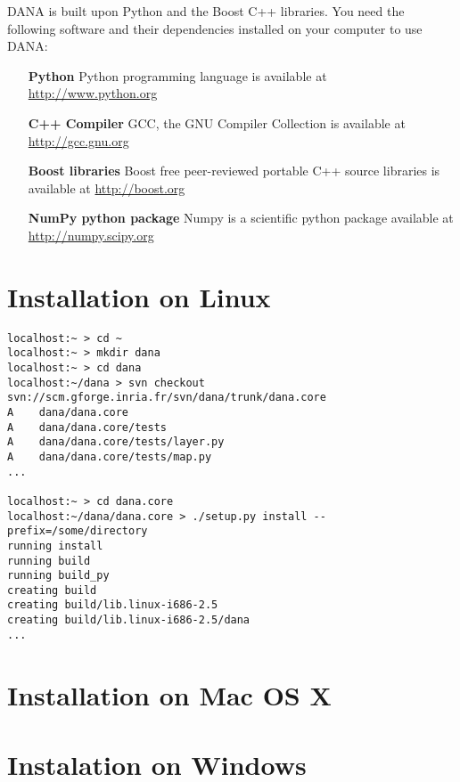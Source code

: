 DANA is built upon Python and the Boost C++ libraries. You need the following
software and their dependencies installed on your computer to use DANA:

\begin{itemize}
    \item [{\bf Python}]
          Python programming language is available at \url{http://www.python.org}\\
          
    \item [{\bf C++ Compiler}]
          GCC, the GNU Compiler Collection is available at \url{http://gcc.gnu.org}\\
          
    \item [{\bf Boost libraries}]
          Boost free peer-reviewed portable C++ source libraries 
          is available at \url{http://boost.org}\\
          
     \item [{\bf NumPy python package}]
           Numpy is a scientific python package available at \url{http://numpy.scipy.org}

\end{itemize}

\section{Installation on Linux}

\begin{verbatim}
localhost:~ > cd ~
localhost:~ > mkdir dana
localhost:~ > cd dana
localhost:~/dana > svn checkout svn://scm.gforge.inria.fr/svn/dana/trunk/dana.core
A    dana/dana.core
A    dana/dana.core/tests
A    dana/dana.core/tests/layer.py
A    dana/dana.core/tests/map.py
...

localhost:~ > cd dana.core
localhost:~/dana/dana.core > ./setup.py install --prefix=/some/directory
running install
running build
running build_py
creating build
creating build/lib.linux-i686-2.5
creating build/lib.linux-i686-2.5/dana
...

\end{verbatim}

\section{Installation on Mac OS X}
\section{Instalation on Windows}

